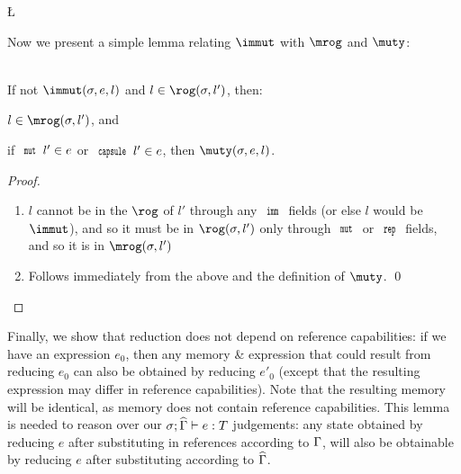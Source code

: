 \L

Now we present a simple lemma relating $\immut$ with $\mrog$ and $\muty$:

\SS\begin{Lemma}\ \\
	\indent If not $\immut(\s,e,l)$ and $l\in\rog(\s,l')$, then:
	\begin{ienumerate}
		\item $l\in\mrog(\s,l')$, and
		\item if $\Kw{mut}\,l'\in e$ or $\Kw{capsule}\,l'\in e$, then $\muty(\s,e,l)$.
	\end{ienumerate}
\end{Lemma}
\SS\begin{proof}
	\SS\begin{enumerate}
		\item $l$ cannot be in the $\rog$ of $l'$ through any $\Kw{imm}$ fields (or else $l$ would be $\immut$), and so it must be in $\rog(\s,l')$ only through $\Kw{mut}$ or $\Kw{rep}$ fields, and so it is in $\mrog(\s,l')$
		\item Follows immediately from the above and the definition of $\muty$.
	\qed\end{enumerate}
\end{proof}

Finally, we show that reduction does not depend on reference capabilities:
if we have an expression $e_0$, then any memory \& expression that could result from reducing $e_0$ 
can also be obtained by reducing $e'_0$ (except that the resulting expression may differ in reference capabilities).
Note that the resulting memory will be identical, as memory does not contain reference capabilities.
This lemma is needed to reason over our $\ty[\s][\demut{\G}]{e}{T}$ judgements: any state obtained by reducing $e$ after substituting in references according to $\Gamma$, will also be obtainable by reducing $e$ after substituting according to $\widehat{\Gamma}$.

